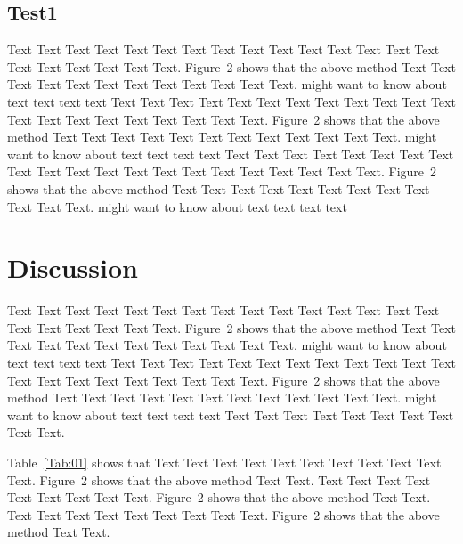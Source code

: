 \documentclass{bioinfo}
\begin{document}
    \subsection{Test1}

    Text Text Text Text Text Text Text Text Text Text Text Text Text
    Text Text Text Text Text Text Text Text.
    Figure~2\vphantom{\ref{fig:02}} shows that the above method Text
    Text Text Text Text Text Text Text Text Text Text Text.
    \citealp{Boffelli03} might want to know about text text text text
    Text Text Text Text Text Text Text Text Text Text Text Text Text
    Text Text Text Text Text Text Text Text.
    Figure~2\vphantom{\ref{fig:02}} shows that the above method Text
    Text Text Text Text Text Text Text Text Text Text Text.
    \citealp{Boffelli03} might want to know about text text text text
    Text Text Text Text Text Text Text Text Text Text Text Text Text
    Text Text Text Text Text Text Text Text.
    Figure~2\vphantom{\ref{fig:02}} shows that the above method Text
    Text Text Text Text Text Text Text Text Text Text Text.
    \citealp{Boffelli03} might want to know about text text text text


    \section{Discussion}

    Text Text Text Text Text Text Text Text Text Text Text Text Text
    Text Text Text Text Text Text Text Text.
    Figure~2\vphantom{\ref{fig:02}} shows that the above method Text
    Text Text Text Text Text Text Text Text Text Text Text.
    \citealp{Boffelli03} might want to know about text text text text
    Text Text Text Text Text Text Text Text Text Text Text Text Text
    Text Text Text Text Text Text Text Text.
    Figure~2\vphantom{\ref{fig:02}} shows that the above method Text
    Text Text Text Text Text Text Text Text Text Text Text.
    \citealp{Boffelli03} might want to know about text text text text
    Text Text Text Text Text Text Text Text Text Text.


    Table~\ref{Tab:01} shows that Text Text Text Text Text Text Text
    Text Text Text Text. Figure~2\vphantom{\ref{fig:02}} shows that
    the above method Text Text. Text Text Text Text Text Text Text
    Text Text. Figure~2\vphantom{\ref{fig:02}} shows that the above
    method Text Text. Text Text Text Text Text Text Text Text Text.
    Figure~2\vphantom{\ref{fig:02}} shows that the above method Text
    Text.
\end{document}
